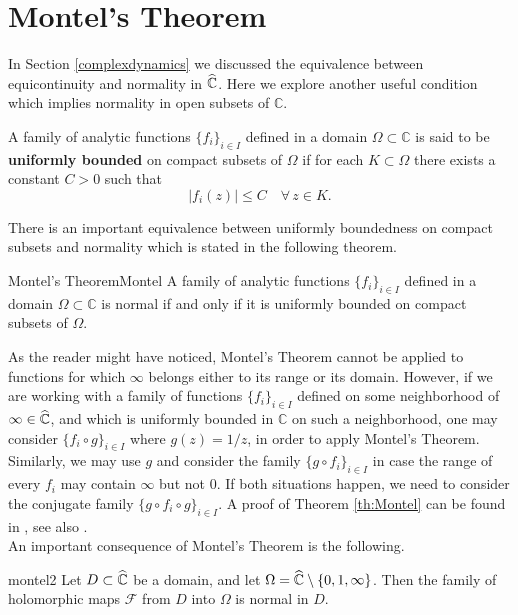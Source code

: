 \section{Montel's Theorem}\label{appendixmontel}

In Section \ref{complexdynamics} we discussed the equivalence between equicontinuity and normality in $\widehat{\mathbb{C}}$. Here we explore another useful condition which implies normality in open subsets of $\mathbb{C}$.


\begin{mydef}{}{}
A family of analytic functions $\{f_i\}_{i\in I}$ defined in a domain $\Omega \subset \mathbb{C}$ is said to be {\bf uniformly bounded} on compact subsets of $\Omega$ if for each $K\subset \Omega$ there exists a constant $C>0$ such that
$$|f_i(z)| \leq C\quad \forall\,z\in K.$$
\end{mydef}

There is an important equivalence between uniformly boundedness on compact subsets and normality which is stated in the following theorem.

\begin{mytheo}{Montel's Theorem}{Montel}
A family of analytic functions $\{f_i\}_{i\in I}$ defined in a domain $\Omega \subset \mathbb{C}$ is normal if and only if it is uniformly bounded on compact subsets of $\Omega$.
\end{mytheo}

As the reader might have noticed,  Montel's Theorem cannot be applied to functions for which $\infty$ belongs either to its range or its domain. However, if we are working with a family of functions $\{f_i\}_{i\in I}$ defined on some neighborhood of $\infty\in \widehat{\mathbb{C}}$, and which is uniformly bounded in $\mathbb{C}$ on such a neighborhood, one may consider $\{f_i\circ g\}_{i\in I}$ where $g(z)=1/z$, in order to apply Montel's Theorem. Similarly, we may use $g$ and consider the family $\{g\circ f_i\}_{i\in I}$ in case the range of every $f_i$ may contain $\infty$ but not $0$. If both situations happen, we need to consider the conjugate family $\{g\circ f_i \circ g\}_{i\in I}$. A proof of Theorem \ref{th:Montel} can be found in \cite[Theorem 15, Section 5.4]{ahlfors}, see also \cite[Thereom 3.3]{stein}.\\

An important consequence of Montel's Theorem is the following.

\begin{mytheo}{}{montel2}
Let $D\subset \widehat{\mathbb{C}}$ be a domain, and let $\Omega =\widehat{\mathbb{C}} \setminus\{0,1,\infty\}$. Then the family of holomorphic maps $\mathcal{F}$ from $D$ into $\Omega$ is normal in $D$.
\end{mytheo}


